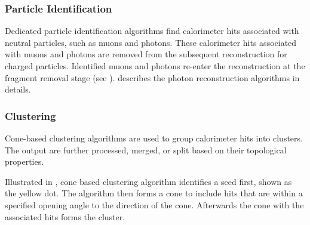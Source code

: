 \subsubsection{Particle Identification}
\label{sec:particleID}

Dedicated particle identification algorithms find calorimeter hits associated with neutral particles, such as muons and photons. These calorimeter hits associated with muons and photons are removed from the subsequent reconstruction for charged particles. Identified muons and photons  re-enter the reconstruction at the fragment removal stage (see ).   describes the photon reconstruction  algorithms in details.




\subsubsection{Clustering}
\label{sec:pandoraConeCluster}

Cone-based clustering algorithms are used to group calorimeter hits into clusters. The output \clusters are further processed, merged, or split based on their topological properties.


Illustrated in , cone based clustering algorithm identifies a seed first, shown as the yellow dot. The algorithm then forms a cone to include hits that are within a specified opening angle to the direction of the cone. Afterwards the cone with the associated hits forms the cluster.


